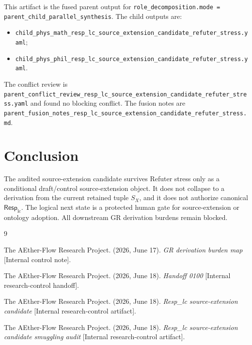 \documentclass[11pt]{article}
\newcommand{\RespLC}{\mathsf{Resp}_{\mathrm{lc}}}
\newcommand{\SX}{S_X}
\begin{document}
This artifact is the fused parent output for
\texttt{role\_decomposition.mode = parent\_child\_parallel\_synthesis}.
The child outputs are:
\begin{itemize}
  \item \texttt{child\_phys\_math\_resp\_lc\_source\_extension\_candidate\_refuter\_stress.yaml};
  \item \texttt{child\_phys\_phil\_resp\_lc\_source\_extension\_candidate\_refuter\_stress.yaml}.
\end{itemize}
The conflict review is
\texttt{parent\_conflict\_review\_resp\_lc\_source\_extension\_candidate\_refuter\_stress.yaml}
and found no blocking conflict. The fusion notes are
\texttt{parent\_fusion\_notes\_resp\_lc\_source\_extension\_candidate\_refuter\_stress.md}.

\section{Conclusion}

The audited source-extension candidate survives Refuter stress only as a
conditional draft/control source-extension object. It does not collapse
to a derivation from the current retained tuple \(\SX\), and it does not
authorize canonical \(\RespLC\). The logical next state is a protected
human gate for source-extension or ontology adoption. All downstream GR
derivation burdens remain blocked.

\begin{thebibliography}{9}

The AEther-Flow Research Project. (2026, June 17). \emph{GR derivation
burden map} [Internal control note].

The AEther-Flow Research Project. (2026, June 18). \emph{Handoff 0100}
[Internal research-control handoff].

The AEther-Flow Research Project. (2026, June 18). \emph{Resp\_lc
source-extension candidate} [Internal research-control artifact].

The AEther-Flow Research Project. (2026, June 18). \emph{Resp\_lc
source-extension candidate smuggling audit} [Internal research-control
artifact].

\end{thebibliography}
\end{document}

